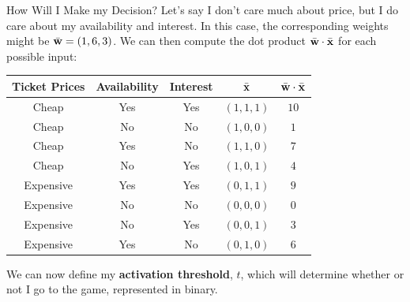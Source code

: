 \documentclass[xcolor=dvipsnames, fontsize=11pt, %
pagesize, %
parskip=half-, t]{beamer}
\begin{document}
\begin{frame}{How Will I Make my Decision?}
Let's say I don't care much about price, but I do care about my availability and interest. In this case, the corresponding weights might be $\bar{\bold{w}}=(1, 6, 3)$.  We can then compute the dot product $\bar{\bold{w}}\cdot \bar{\bold{x}}$ for each possible input:  
\begin{table} 
\center 
\begin{tabular}{cccc|c}
Ticket Prices & Availability & Interest & $\bar{\bold{x}}$ & $\bar{\bold{w}}\cdot \bar{\bold{x}}$ \\ \hline 
Cheap & Yes & Yes & $(1,1,1)$ & $10$ \\
Cheap & No & No & $(1,0,0)$ & $1$ \\
Cheap & Yes & No & $(1,1,0)$ & $7$\\
Cheap & No & Yes & $(1,0,1)$ & $4$   \\
Expensive & Yes & Yes & $(0,1,1)$ & $9$ \\
Expensive & No & No & $(0,0,0)$  & $0$ \\
Expensive & No & Yes & $(0,0,1)$ & $3$\\
Expensive & Yes & No & $(0,1,0)$ & $6$
\end{tabular}
\end{table} 
\vspace{0.05\textheight}
We can now define my \textbf{activation threshold}, $t$, which will determine whether or not I go to the game, represented in binary.
\end{frame}
\end{document}
